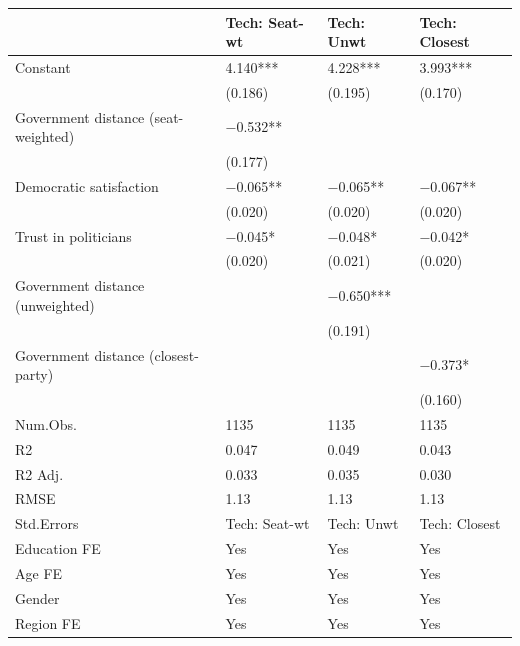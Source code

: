 \begin{tabular}{llll}
\hline
& Tech: Seat-wt & Tech: Unwt & Tech: Closest \\ \hline
Constant & \num{4.140}*** & \num{4.228}*** & \num{3.993}*** \\
& (\num{0.186}) & (\num{0.195}) & (\num{0.170}) \\
Government distance (seat-weighted) & \num{-0.532}** &  &  \\
& (\num{0.177}) &  &  \\
Democratic satisfaction & \num{-0.065}** & \num{-0.065}** & \num{-0.067}** \\
& (\num{0.020}) & (\num{0.020}) & (\num{0.020}) \\
Trust in politicians & \num{-0.045}* & \num{-0.048}* & \num{-0.042}* \\
& (\num{0.020}) & (\num{0.021}) & (\num{0.020}) \\
Government distance (unweighted) &  & \num{-0.650}*** &  \\
&  & (\num{0.191}) &  \\
Government distance (closest-party) &  &  & \num{-0.373}* \\
&  &  & (\num{0.160}) \\
Num.Obs. & \num{1135} & \num{1135} & \num{1135} \\
R2 & \num{0.047} & \num{0.049} & \num{0.043} \\
R2 Adj. & \num{0.033} & \num{0.035} & \num{0.030} \\
RMSE & \num{1.13} & \num{1.13} & \num{1.13} \\
Std.Errors & Tech: Seat-wt & Tech: Unwt & Tech: Closest \\
Education FE & Yes & Yes & Yes \\
Age FE & Yes & Yes & Yes \\
Gender & Yes & Yes & Yes \\
Region FE & Yes & Yes & Yes \\
\hline
\end{tabular}
